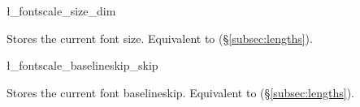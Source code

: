 \documentclass{beerydoc}
\begin{document}
\begin{variable}{\l_fontscale_size_dim}
  \begin{syntax}
  \end{syntax}
  Stores the current font size.
  Equivalent to  (\S\ref{subsec:lengths}).
\end{variable}

\begin{variable}{\l_fontscale_baselineskip_skip}
  \begin{syntax}
  \end{syntax}
  Stores the current font baselineskip.
  Equivalent to  (\S\ref{subsec:lengths}).
\end{variable}
\end{document}
